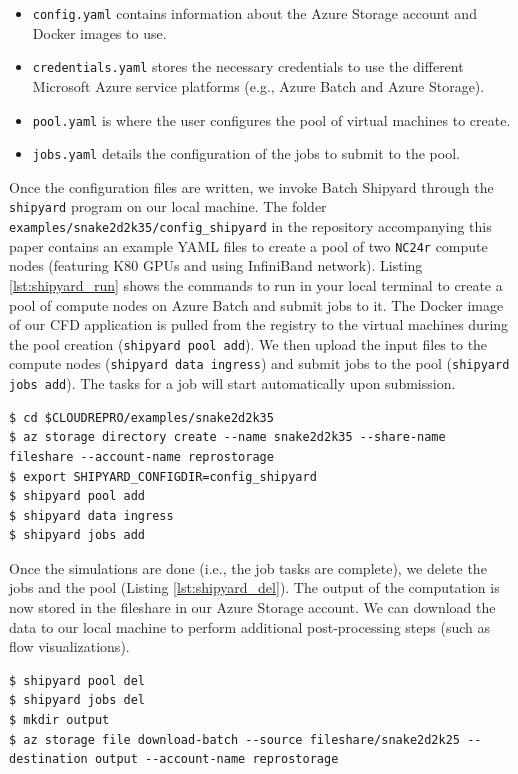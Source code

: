 \documentclass[10pt,journal,compsoc]{IEEEtran}
\begin{document}
\begin{itemize}
    \item \texttt{config.yaml} contains information about the Azure Storage account and Docker images to use.
    \item \texttt{credentials.yaml} stores the necessary credentials to use the different Microsoft Azure service platforms (e.g., Azure Batch and Azure Storage).
    \item \texttt{pool.yaml} is where the user configures the pool of virtual machines to create.
    \item \texttt{jobs.yaml} details the configuration of the jobs to submit to the pool.
\end{itemize}

Once the configuration files are written, we invoke Batch Shipyard through the \texttt{shipyard} program on our local machine.
The folder \texttt{examples/snake2d2k35/config\_shipyard} in the repository accompanying this paper contains an example YAML files to create a pool of two \texttt{NC24r} compute nodes (featuring K80 GPUs and using InfiniBand network).
Listing \ref{lst:shipyard_run} shows the commands to run in your local terminal to create a pool of compute nodes on Azure Batch and submit jobs to it.
The Docker image of our CFD application is pulled from the registry to the virtual machines during the pool creation (\texttt{shipyard pool add}).
We then upload the input files to the compute nodes (\texttt{shipyard data ingress}) and submit jobs to the pool (\texttt{shipyard jobs add}). The tasks for a job will start automatically upon submission.

\begin{lstlisting}[label=lst:shipyard_run,caption={Create a pool and submit jobs to it.}]
$ cd $CLOUDREPRO/examples/snake2d2k35
$ az storage directory create --name snake2d2k35 --share-name fileshare --account-name reprostorage
$ export SHIPYARD_CONFIGDIR=config_shipyard
$ shipyard pool add
$ shipyard data ingress
$ shipyard jobs add
\end{lstlisting}

Once the simulations are done (i.e., the job tasks are complete), we delete the jobs and the pool (Listing \ref{lst:shipyard_del}).
The output of the computation is now stored in the fileshare in our Azure Storage account.
We can download the data to our local machine to perform additional post-processing steps (such as flow visualizations).

\begin{lstlisting}[label=lst:shipyard_del,caption={Delete the pool and jobs, and download to output to a local machine.}]
$ shipyard pool del
$ shipyard jobs del
$ mkdir output
$ az storage file download-batch --source fileshare/snake2d2k25 --destination output --account-name reprostorage
\end{lstlisting}
\end{document}
